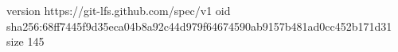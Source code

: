 version https://git-lfs.github.com/spec/v1
oid sha256:68ff7445f9d35eca04b8a92c44d979f64674590ab9157b481ad0cc452b171d31
size 145
